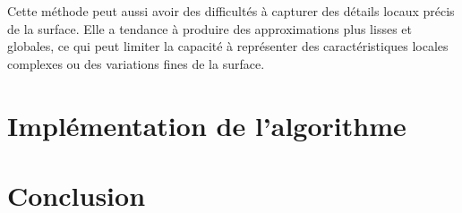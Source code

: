 \documentclass{article}
\begin{document}
Cette méthode peut aussi avoir des difficultés à capturer des détails locaux précis de la surface. Elle a tendance à produire des approximations plus lisses et globales, ce qui peut limiter la capacité à représenter des caractéristiques locales complexes ou des variations fines de la surface.



\section{Implémentation de l'algorithme}



\section{Conclusion}
\end{document}
